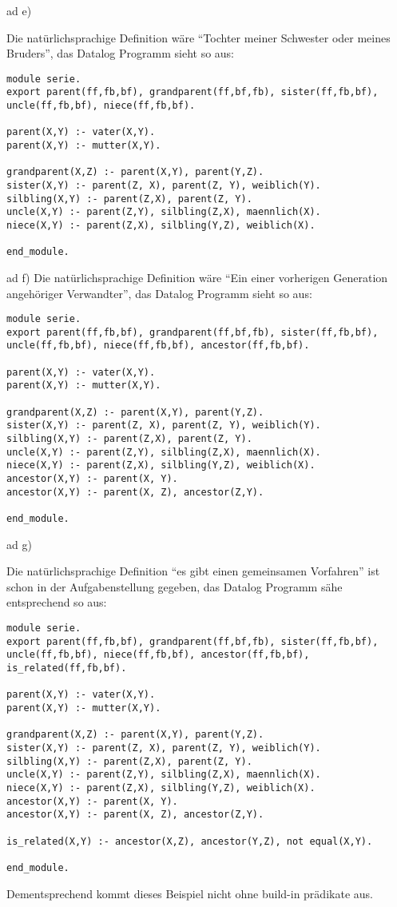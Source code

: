 \documentclass[12pt,a4paper]{amsart}
\begin{document}
\medskip

ad e)

Die natürlichsprachige Definition wäre ``Tochter meiner Schwester oder meines Bruders'', das Datalog Programm sieht so aus:

\begin{lstlisting}
module serie.
export parent(ff,fb,bf), grandparent(ff,bf,fb), sister(ff,fb,bf), uncle(ff,fb,bf), niece(ff,fb,bf).

parent(X,Y) :- vater(X,Y).
parent(X,Y) :- mutter(X,Y).

grandparent(X,Z) :- parent(X,Y), parent(Y,Z).
sister(X,Y) :- parent(Z, X), parent(Z, Y), weiblich(Y).
silbling(X,Y) :- parent(Z,X), parent(Z, Y).
uncle(X,Y) :- parent(Z,Y), silbling(Z,X), maennlich(X).
niece(X,Y) :- parent(Z,X), silbling(Y,Z), weiblich(X).

end_module.
\end{lstlisting}

\medskip

ad f)
Die natürlichsprachige Definition wäre ``Ein einer vorherigen Generation angehöriger Verwandter'', das Datalog Programm sieht so aus:

\begin{lstlisting}
module serie.
export parent(ff,fb,bf), grandparent(ff,bf,fb), sister(ff,fb,bf), uncle(ff,fb,bf), niece(ff,fb,bf), ancestor(ff,fb,bf).

parent(X,Y) :- vater(X,Y).
parent(X,Y) :- mutter(X,Y).

grandparent(X,Z) :- parent(X,Y), parent(Y,Z).
sister(X,Y) :- parent(Z, X), parent(Z, Y), weiblich(Y).
silbling(X,Y) :- parent(Z,X), parent(Z, Y).
uncle(X,Y) :- parent(Z,Y), silbling(Z,X), maennlich(X).
niece(X,Y) :- parent(Z,X), silbling(Y,Z), weiblich(X).
ancestor(X,Y) :- parent(X, Y).
ancestor(X,Y) :- parent(X, Z), ancestor(Z,Y).

end_module.
\end{lstlisting}

\medskip

ad g)

Die natürlichsprachige Definition ``es gibt einen gemeinsamen Vorfahren'' ist schon in der Aufgabenstellung gegeben, das Datalog Programm sähe entsprechend so aus:

\begin{lstlisting}
module serie.
export parent(ff,fb,bf), grandparent(ff,bf,fb), sister(ff,fb,bf), uncle(ff,fb,bf), niece(ff,fb,bf), ancestor(ff,fb,bf), is_related(ff,fb,bf).

parent(X,Y) :- vater(X,Y).
parent(X,Y) :- mutter(X,Y).

grandparent(X,Z) :- parent(X,Y), parent(Y,Z).
sister(X,Y) :- parent(Z, X), parent(Z, Y), weiblich(Y).
silbling(X,Y) :- parent(Z,X), parent(Z, Y).
uncle(X,Y) :- parent(Z,Y), silbling(Z,X), maennlich(X).
niece(X,Y) :- parent(Z,X), silbling(Y,Z), weiblich(X).
ancestor(X,Y) :- parent(X, Y).
ancestor(X,Y) :- parent(X, Z), ancestor(Z,Y).

is_related(X,Y) :- ancestor(X,Z), ancestor(Y,Z), not equal(X,Y).

end_module.
\end{lstlisting}

Dementsprechend kommt dieses Beispiel nicht ohne build-in prädikate aus.

\medskip
\end{document}
